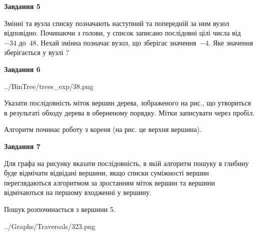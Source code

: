 \documentclass[12pt, ukrainian]{article}
\begin{document}
{\begin {large}
{\begin {center}\textbf{Завдання 5}\end {center}}\par
Змінні  та  вузла списку позначають наступний та попередній за ним вузол відповідно. Починаючи з голови, у список записано послідовні цілі числа від~$-34$ до~$48$. Нехай змінна  позначає вузол, що зберігає значення~$-4$.
Яке значення зберігається у вузлі  ?\par
\newpage

{\begin {center}\textbf{Завдання 6}\end {center}}\par

\begin{center}
	{../BinTree/trees_exp/38.png}
\end{center}
Указати послідовність міток вершин дерева, зображеного на рис., що утвориться в результаті обходу дерева в оберненому порядку. Мітки записувати через пробіл.\par Алгоритм починає роботу з кореня (на рис. це верхня вершина).\par
\newpage

{\begin {center}\textbf{Завдання 7}\end {center}}\par
Для графа на рисунку вказати послідовність, в якій алгоритм пошуку в глибину буде відмічати відвідані вершини, якщо списки суміжності вершин переглядаються алгоритмом за зростанням міток вершин та вершини відмічаються на першому вход\-женні у вершину.\par
Пошук розпочинається з вершини 5.\par

\begin{center}
	{../Graphs/Traversals/323.png}
\end{center}\par
\newpage


\end{large}}
\end{document}
